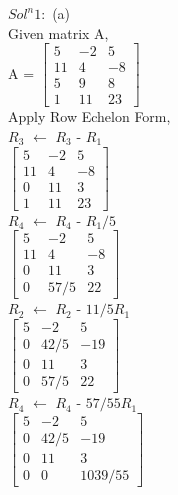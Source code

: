 \documentclass{article}
\begin{document}
$Sol^n 1:$ (a)\\

Given matrix A, \\

A = $\begin{bmatrix}
    5 & -2 & 5\\
    11 & 4 & -8\\
    5 & 9 & 8 \\
    1 & 11 & 23
    \end{bmatrix}$ \\
    
Apply Row Echelon Form,\\

$R_3$ $\leftarrow$ $R_3$ - $R_1$\\

$\begin{bmatrix}
    5 & -2 & 5\\
    11 & 4 & -8\\
    0 & 11 & 3 \\
    1 & 11 & 23
    \end{bmatrix}$ \\
    
$R_4$ $\leftarrow$ $R_4$ - $R_1/5$\\

$\begin{bmatrix}
    5 & -2 & 5\\
    11 & 4 & -8\\
    0 & 11 & 3 \\
    0 & 57/5 & 22
    \end{bmatrix}$ \\
    
$R_2$ $\leftarrow$ $R_2$ - $11/5R_1$\\

$\begin{bmatrix}
    5 & -2 & 5\\
    0 & 42/5 & -19\\
    0 & 11 & 3 \\
    0 & 57/5 & 22
    \end{bmatrix}$ \\

$R_4$ $\leftarrow$ $R_4$ - $57/55R_1$\\

$\begin{bmatrix}
    5 & -2 & 5\\
    0 & 42/5 & -19\\
    0 & 11 & 3 \\
    0 & 0 & 1039/55
    \end{bmatrix}$ \\
    
\end{document}
